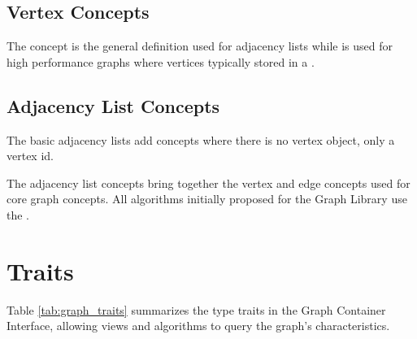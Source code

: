 {\small
     
}

\subsection{Vertex Concepts}
The  concept is the general definition used for adjacency lists while  is used for
high performance graphs where vertices typically stored in a .
{\small
     
}

\subsection{Adjacency List Concepts}
The basic adjacency lists add concepts where there is no vertex object, only a vertex id.
{\small
     
}

The adjacency list concepts bring together the vertex and edge concepts used for core graph concepts. 
All algorithms initially proposed for the Graph Library use the .
{\small
     
}

\section{Traits}
Table \ref{tab:graph_traits} summarizes the type traits in the Graph Container Interface, allowing views and algorithms to query the graph's characteristics.

